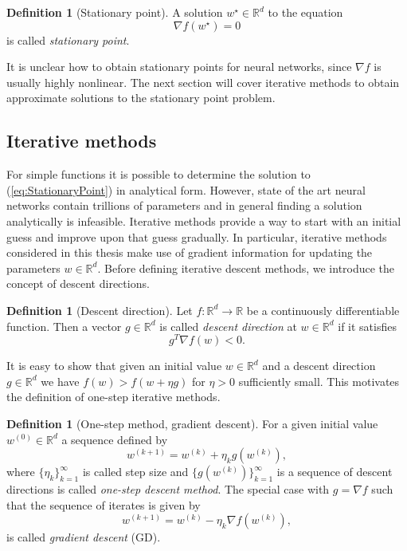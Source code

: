 \documentclass[12pt]{article}
\theoremstyle{definition}
\newtheorem{definition}[theorem]{Definition}
\numberwithin{equation}{section}
\begin{document}
\begin{definition}[Stationary point]
  A solution $w^\star \in \mathbb{R}^d$ to the equation
  \begin{equation}
  \label{eq:StationaryPoint}
    \nabla f(w^\star) = 0
  \end{equation}
  is called \emph{stationary point}.
\end{definition}
It is unclear how to obtain stationary points for neural networks, since $\nabla f$ is usually highly nonlinear. The next section will cover iterative methods to obtain approximate solutions to the stationary point problem.

\subsection{Iterative methods}
For simple functions it is possible to determine the solution to (\ref*{eq:StationaryPoint}) in analytical form. However, state of the art neural networks contain trillions of parameters and in general finding a solution analytically is infeasible. Iterative methods provide a way to start with an initial guess and improve upon that guess gradually. In particular, iterative methods considered in this thesis make use of gradient information for updating the parameters $w \in \mathbb{R}^d$. Before defining iterative descent methods, we introduce the concept of descent directions. 
\begin{definition}[Descent direction]
  Let $f: \mathbb{R}^d \rightarrow \mathbb{R}$ be a continuously differentiable function. Then a vector $g \in \mathbb{R}^d$ is called \emph{descent direction} at $w \in \mathbb{R}^d$ if it satisfies 
  \begin{equation}
    g^T \nabla f(w) < 0.
  \end{equation} 
\end{definition}
It is easy to show that given an initial value $w \in \mathbb{R}^d$ and a descent direction $g \in \mathbb{R}^d$ we have $f(w) > f(w + \eta g)$ for $\eta > 0$ sufficiently small. This motivates the definition of one-step iterative methods.
\begin{definition}[One-step method, gradient descent]
  For a given initial value $w^{(0)}\in \mathbb{R}^d$ a sequence defined by
\begin{equation}
  w^{(k+1)} = w^{(k)} + \eta_k g(w^{(k)}),
\end{equation}
  where $\{\eta_k\}_{k=1}^\infty$ is called step size and $\{g(w^{(k)})\}_{k=1}^\infty$ is a sequence of descent directions is called \emph{one-step descent method}. The special case with $g = \nabla f$ such that the sequence of iterates is given by
  \begin{equation}
    \label{eq:gradient_descent}
    w^{(k+1)} = w^{(k)} - \eta_k \nabla f(w^{(k)}),
  \end{equation}
  is called \emph{gradient descent} (GD).
\end{definition}
\end{document}
